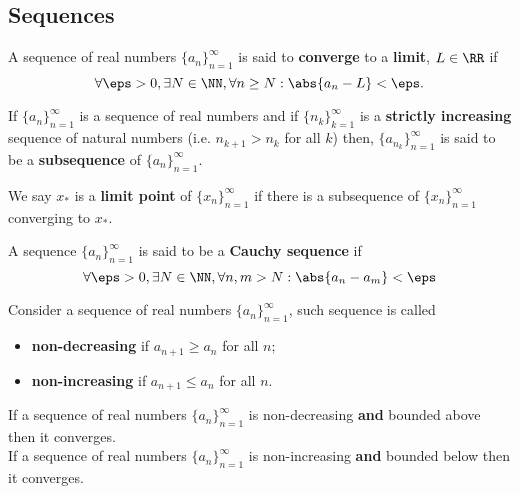 \documentclass[12pt, a4paper]{article}
\begin{document}
\subsection{Sequences}

\begin{definition}
    A sequence of real numbers \(\{a_n\}_{n=1}^{\infty}\) is said to \textbf{converge} to a \textbf{limit}, \(L \in \RR\) if 
    \[\forall \eps >0, \exists N\in \NN, \forall n\geq N : \abs{a_n-L}<\eps.\]
\end{definition}

\begin{definition}
    If \(\{a_n\}_{n=1}^{\infty}\) is a sequence of real numbers and if \(\{n_k\}_{k=1}^{\infty}\) is a \textbf{strictly increasing} sequence of natural numbers (i.e. \(n_{k+1}>n_k\) for all \(k\)) then, \(\{a_{n_k}\}_{n=1}^{\infty}\) is said to be a \textbf{subsequence} of \(\{a_n\}_{n=1}^{\infty}\).
\end{definition}

\begin{definition}
    We say \(x_*\) is a \textbf{limit point} of \(\{x_n\}_{n=1}^{\infty}\) if there is a subsequence of \(\{x_n\}_{n=1}^{\infty}\) converging to \(x_*\).
\end{definition}

\begin{definition}
    A sequence \(\{a_n\}_{n=1}^{\infty}\) is said to be a \textbf{Cauchy sequence} if
    \[\forall \eps >0, \exists N\in \NN, \forall n,m>N : \abs{a_n-a_m}<\eps\]
\end{definition}

\begin{definition}
    Consider a sequence of real numbers \(\{a_n\}_{n=1}^{\infty}\), such sequence is called 
    \begin{itemize}
        \item \textbf{non-decreasing} if \(a_{n+1} \geq a_n\) for all \(n\);
        \item \textbf{non-increasing} if \(a_{n+1} \leq a_n\) for all \(n\).
    \end{itemize}
\end{definition}

\begin{theorem}
    If a sequence of real numbers \(\{a_n\}_{n=1}^{\infty}\) is non-decreasing \textbf{and} bounded above then it converges. \\
    If a sequence of real numbers \(\{a_n\}_{n=1}^{\infty}\) is non-increasing \textbf{and} bounded below then it converges.
\end{theorem}
\end{document}
